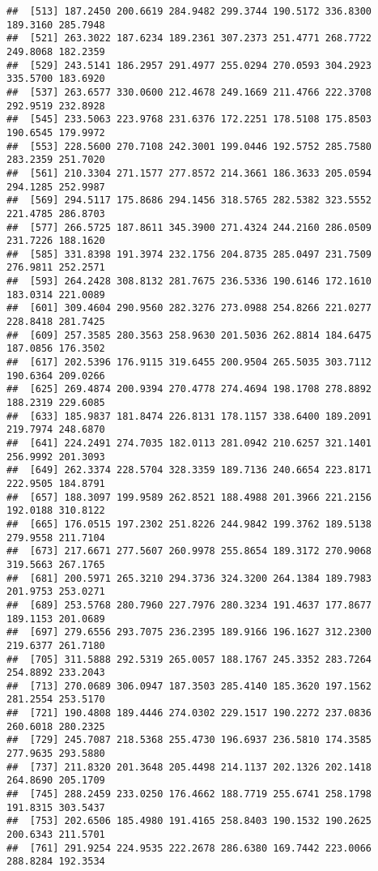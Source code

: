 \documentclass[
]{article}
\begin{document}
\begin{verbatim}
##  [513] 187.2450 200.6619 284.9482 299.3744 190.5172 336.8300 189.3160 285.7948
##  [521] 263.3022 187.6234 189.2361 307.2373 251.4771 268.7722 249.8068 182.2359
##  [529] 243.5141 186.2957 291.4977 255.0294 270.0593 304.2923 335.5700 183.6920
##  [537] 263.6577 330.0600 212.4678 249.1669 211.4766 222.3708 292.9519 232.8928
##  [545] 233.5063 223.9768 231.6376 172.2251 178.5108 175.8503 190.6545 179.9972
##  [553] 228.5600 270.7108 242.3001 199.0446 192.5752 285.7580 283.2359 251.7020
##  [561] 210.3304 271.1577 277.8572 214.3661 186.3633 205.0594 294.1285 252.9987
##  [569] 294.5117 175.8686 294.1456 318.5765 282.5382 323.5552 221.4785 286.8703
##  [577] 266.5725 187.8611 345.3900 271.4324 244.2160 286.0509 231.7226 188.1620
##  [585] 331.8398 191.3974 232.1756 204.8735 285.0497 231.7509 276.9811 252.2571
##  [593] 264.2428 308.8132 281.7675 236.5336 190.6146 172.1610 183.0314 221.0089
##  [601] 309.4604 290.9560 282.3276 273.0988 254.8266 221.0277 228.8418 281.7425
##  [609] 257.3585 280.3563 258.9630 201.5036 262.8814 184.6475 187.0856 176.3502
##  [617] 202.5396 176.9115 319.6455 200.9504 265.5035 303.7112 190.6364 209.0266
##  [625] 269.4874 200.9394 270.4778 274.4694 198.1708 278.8892 188.2319 229.6085
##  [633] 185.9837 181.8474 226.8131 178.1157 338.6400 189.2091 219.7974 248.6870
##  [641] 224.2491 274.7035 182.0113 281.0942 210.6257 321.1401 256.9992 201.3093
##  [649] 262.3374 228.5704 328.3359 189.7136 240.6654 223.8171 222.9505 184.8791
##  [657] 188.3097 199.9589 262.8521 188.4988 201.3966 221.2156 192.0188 310.8122
##  [665] 176.0515 197.2302 251.8226 244.9842 199.3762 189.5138 279.9558 211.7104
##  [673] 217.6671 277.5607 260.9978 255.8654 189.3172 270.9068 319.5663 267.1765
##  [681] 200.5971 265.3210 294.3736 324.3200 264.1384 189.7983 201.9753 253.0271
##  [689] 253.5768 280.7960 227.7976 280.3234 191.4637 177.8677 189.1153 201.0689
##  [697] 279.6556 293.7075 236.2395 189.9166 196.1627 312.2300 219.6377 261.7180
##  [705] 311.5888 292.5319 265.0057 188.1767 245.3352 283.7264 254.8892 233.2043
##  [713] 270.0689 306.0947 187.3503 285.4140 185.3620 197.1562 281.2554 253.5170
##  [721] 190.4808 189.4446 274.0302 229.1517 190.2272 237.0836 260.6018 280.2325
##  [729] 245.7087 218.5368 255.4730 196.6937 236.5810 174.3585 277.9635 293.5880
##  [737] 211.8320 201.3648 205.4498 214.1137 202.1326 202.1418 264.8690 205.1709
##  [745] 288.2459 233.0250 176.4662 188.7719 255.6741 258.1798 191.8315 303.5437
##  [753] 202.6506 185.4980 191.4165 258.8403 190.1532 190.2625 200.6343 211.5701
##  [761] 291.9254 224.9535 222.2678 286.6380 169.7442 223.0066 288.8284 192.3534

\end{verbatim}
\end{document}
